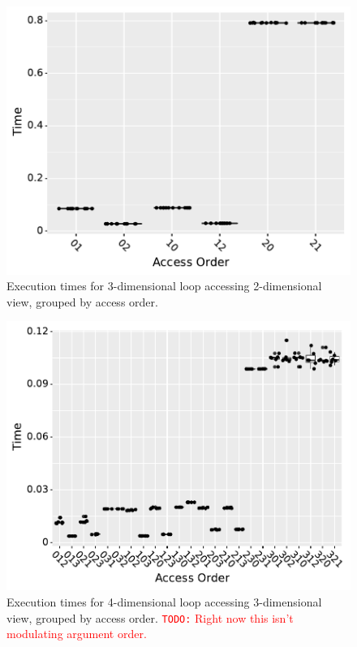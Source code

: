 \documentclass[sigconf, table]{acmart}
\newcommand{\todo}[1]{{\textcolor{red}{{\tt{TODO:}}\,\,#1 }}}
\begin{document}
\begin{figure}
	\includegraphics[width=\columnwidth]{benchmark2_boxplot.pdf}
	\caption{Execution times for 3-dimensional loop accessing 2-dimensional view, grouped by access order.}
	\label{AccessBenchmark2}
\end{figure}

\begin{figure}
	\includegraphics[width=\columnwidth]{benchmark3_boxplot.pdf}
	\caption{Execution times for 4-dimensional loop accessing 3-dimensional view, grouped by access order. \todo{Right now this isn't modulating argument order.}}
	\label{AccessBenchmark3}
\end{figure}
\end{document}
